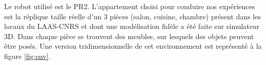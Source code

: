 \documentclass[a4paper,11pt,twoside]{StyleThese}
\begin{document}


Le robot utilisé est le PR2. L'appartement choisi pour conduire nos expériences est la réplique taille réelle
d’un 3 pièces (salon, cuisine, chambre) présent dans les locaux du LAAS-CNRS et dont une modélisation fidèle a été faite sur simulateur 3D.
Dans chaque pièce se trouvent des meubles, sur lesquels des objets peuvent être posés. Une version tridimensionnelle de cet environnement est représenté à la figure \ref{fig:env}.
\end{document}
